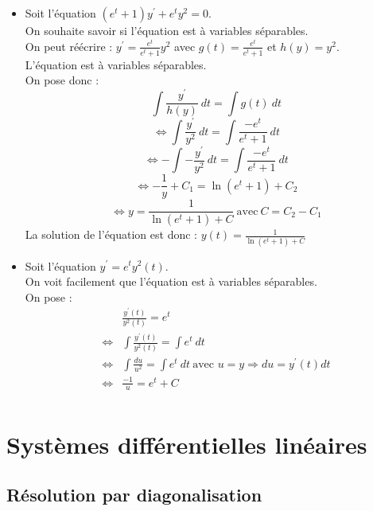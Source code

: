 \begin{ex}
\begin{itemize}
    \item Soit l'équation $(e^t+1)y^{\prime}+e^ty^2=0$.\\
    On souhaite savoir si l'équation est à variables séparables.\\
    On peut réécrire : $y^{\prime}=\frac{e^t}{e^t+1}y^2$ avec $g(t)=\frac{e^t}{e^t+1}$ et $h(y)=y^2$.\\
    L'équation est à variables séparables.\\
    On pose donc :\\
    $$\int\frac{y^{\prime}}{h(y)}\ dt=\int g(t)\ dt$$
    $$\Leftrightarrow\int\frac{y^{\prime}}{y^2}\ dt=\int \frac{-e^t}{e^t+1}\ dt$$
    $$\Leftrightarrow-\int -\frac{y^{\prime}}{y^2}\ dt=\int \frac{-e^t}{e^t+1}\ dt$$
    $$\Leftrightarrow-\frac{1}{y}+C_1= \ln(e^t+1) +C_2$$
    $$\Leftrightarrow y=\frac{1}{\ln(e^t+1)+C}\ \text{avec}\ C=C_2-C_1$$
    La solution de l'équation est donc : $y(t)=\frac{1}{\ln(e^t+1)+C}$
    \item Soit l'équation $y^{\prime}=e^ty^2(t)$.\\
    On voit facilement que l'équation est à variables séparables.\\
    On pose :
    \begin{align*}
        & \frac{y^{\prime}(t)}{y^2(t)}=e^t\\
        \Leftrightarrow & \int\frac{y^{\prime}(t)}{y^2(t)}=\int e^t\ dt\\
        \Leftrightarrow & \int\frac{du}{u^2}=\int e^t\ dt\ \text{avec } u=y\Rightarrow du=y^{\prime}(t)dt\\
        \Leftrightarrow & \frac{-1}{u}=e^t+C\\
    \end{align*}
\end{itemize}
\end{ex}
\section{Systèmes différentielles linéaires}
\subsection{Résolution par diagonalisation}
